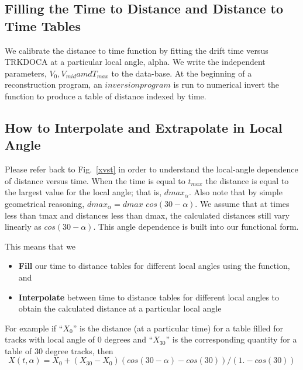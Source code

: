\subsection{Filling the Time to Distance and Distance to Time Tables}
We calibrate the distance to time function by fitting the drift time versus
TRKDOCA at a particular local angle, alpha.  We write the independent parameters,
$V_0, V_{mid} amd T_{max}$ to the data-base.  At the beginning of a reconstruction program,
an $inversion program$ is run to numerical invert the function to produce a table
of distance indexed by time.


\subsection{How to Interpolate and Extrapolate in Local Angle}
Please refer back to Fig.~\ref{xvst} in order to understand the local-angle dependence
of distance versus time.  When the time is equal to $t_{max}$ the distance is equal to
the largest value for the local angle; that is, $dmax_{\alpha}$.  Also note that by
simple geometrical reasoning, $dmax_{\alpha} = dmax$  $cos(30-\alpha)$.
We assume that at times less than tmax and distances less than dmax, the calculated
distances still vary linearly as $cos(30-\alpha)$.  This angle dependence is built into
our functional form.

This means that we
\begin{itemize}
\item {\bf Fill} our time to distance tables for different local angles using the function, and
\item {\bf Interpolate} between time to distance tables for different local angles to obtain
the calculated distance at a particular local angle
\end{itemize}
For example if ``$X_0$'' is the distance (at a particular time) for a table filled for tracks with local angle of 0 degrees
and ``$X_{30}$'' is the corresponding quantity for a table of 30 degree tracks, then
\begin{equation} 
\label{eq-extrap30}
X(t,\alpha) = X_0 + (X_{30}-X_0) (cos(30-\alpha) - cos(30)) / (1. - cos(30))
\end{equation}




